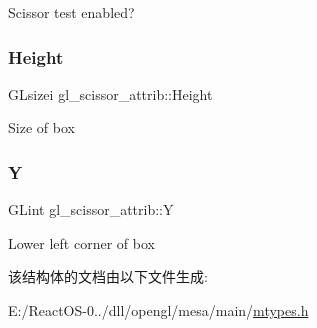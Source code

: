 Scissor test enabled? \mbox{\label{structgl__scissor__attrib_a180c6ba85469cd6bc737ab2e39d106ec}} 
\subsubsection{\texorpdfstring{Height}{Height}}
{\footnotesize\ttfamily G\+Lsizei gl\+\_\+scissor\+\_\+attrib\+::\+Height}

Size of box \mbox{\label{structgl__scissor__attrib_a65c3ae2843074b6c5f954fb26fba70c1}} 
\subsubsection{\texorpdfstring{Y}{Y}}
{\footnotesize\ttfamily G\+Lint gl\+\_\+scissor\+\_\+attrib\+::Y}

Lower left corner of box 

该结构体的文档由以下文件生成\+:\begin{DoxyCompactItemize}
\item 
E\+:/\+React\+O\+S-\/0../dll/opengl/mesa/main/\hyperlink{mtypes_8h}{mtypes.\+h}\end{DoxyCompactItemize}
